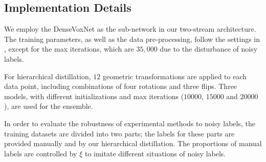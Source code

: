 \documentclass[letterpaper]{article} %
\begin{document}
\subsection{Implementation Details}
We employ the DenseVoxNet \cite{Yu2017} as the sub-network in our two-stream architecture.
The training parameters, as well as the data pre-processing, follow the settings in \cite{Yu2017}, except for the max iterations, which are $35,000$ due to the disturbance of noisy labels.

For hierarchical distillation, $12$ geometric transformations are applied to each data point, including combinations of four rotations and three flips.
Three models, with different initializations and max iterations ($10000$, $15000$ and $20000$), are used for the ensemble.

In order to evaluate the robustness of experimental methods to noisy labels, the training datasets are divided into two parts; the labels for these parts are provided manually and by our hierarchical distillation.
The proportions of manual labels are controlled by $\xi$ to imitate different situations of noisy labels.
\end{document}
